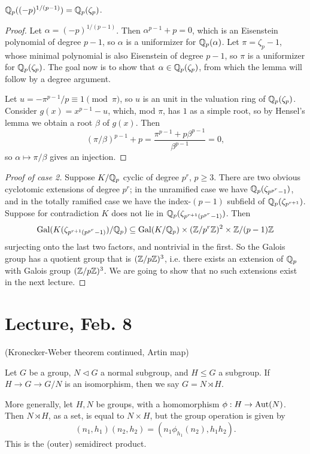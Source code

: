 \documentclass[11pt]{amsart}
\begin{document}
\begin{lem}
    $\mathbb{Q}_p((-p)^{1/(p-1)}) = \mathbb{Q}_p(\zeta_p)$.
\end{lem}

\begin{proof}
    Let $\alpha = (-p)^{1/(p-1)}$. Then $\alpha^{p-1} + p = 0$, which is an Eisenstein polynomial of degree $p-1$, so $\alpha$ is a uniformizer for $\mathbb{Q}_p(\alpha)$. Let $\pi = \zeta_p-1$, whose minimal polynomial is also Eisenstein of degree $p-1$, so $\pi$ is a uniformizer for $\mathbb{Q}_p(\zeta_p)$. The goal now is to show that $\alpha \in \mathbb{Q}_p(\zeta_p)$, from which the lemma will follow by a degree argument.

    Let $u = -\pi^{p-1}/p \equiv 1\pmod{\pi}$, so $u$ is an unit in the valuation ring of $\mathbb{Q}_p(\zeta_p)$. Consider $g(x) = x^{p-1} - u$, which, mod $\pi$, has $1$ as a simple root, so by Hensel's lemma we obtain a root $\beta$ of $g(x)$. Then 
    \[(\pi/\beta)^{p-1} + p = \frac{\pi^{p-1} + p\beta^{p-1}}{\beta^{p-1}} = 0,\]
    so $\alpha\mapsto \pi/\beta$ gives an injection.
\end{proof}


\begin{proof}[Proof of case 2]
    Suppose $K/\mathbb{Q}_p$ cyclic of degree $p^r$, $p\ge 3$. There are two obvious cyclotomic extensions of degree $p^r$; in the unramified case we have $\mathbb{Q}_p(\zeta_{p^{p^r}-1})$, and in the totally ramified case we have the index-$(p-1)$ subfield of $\mathbb{Q}_p(\zeta_{p^{r+1}})$. Suppose for contradiction $K$ does not lie in $\mathbb{Q}_p(\zeta_{p^{r+1}(p^{p^r}-1)})$. Then 
    \[\operatorname{Gal}(K(\zeta_{p^{r+1}(p^{p^r}-1)})/\mathbb{Q}_p) \subseteq \operatorname{Gal}(K/\mathbb{Q}_p) \times (\mathbb{Z}/p^r\mathbb{Z})^2 \times \mathbb{Z}/(p-1)\mathbb{Z}\]
    surjecting onto the last two factors, and nontrivial in the first. So the Galois group has a quotient group that is $(\mathbb{Z}/p\mathbb{Z})^3$, i.e. there exists an extension of $\mathbb{Q}_p$ with Galois group $(\mathbb{Z}/p\mathbb{Z})^3$. We are going to show that no such extensions exist in the next lecture.
\end{proof}


\section{Lecture, Feb. 8}

(Kronecker-Weber theorem continued, Artin map)

\begin{defn}
    Let $G$ be a group, $N\lhd G$ a normal subgroup, and $H\le G$ a subgroup. If $H\to G\to G/N$ is an isomorphism, then we say $G = N\rtimes H$. 

    More generally, let $H,N$ be groups, with a homomorphism $\phi: H\to \operatorname{Aut}(N)$. Then $N\rtimes H$, as a set, is equal to $N\times H$, but the group operation is given by
    \[(n_1,h_1)(n_2,h_2) = (n_1\phi_{h_1}(n_2), h_1h_2).\]
    This is the (outer) semidirect product.
\end{defn}
\end{document}
